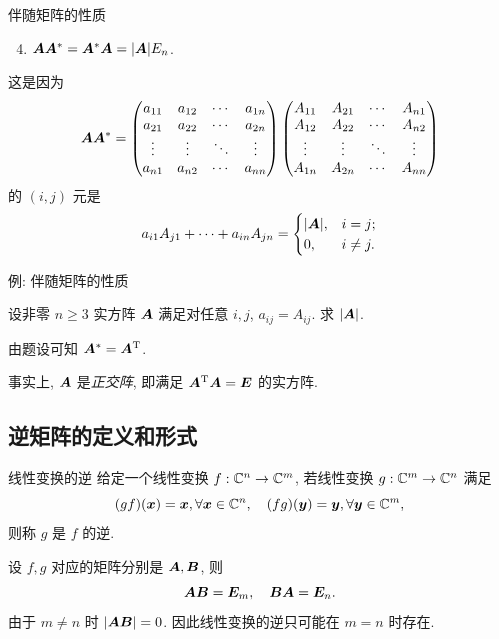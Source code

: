 \begin{frame}{伴随矩阵的性质}
	\begin{second@}
		\begin{enumerate}
			\setcounter{enumi}{3}
			\item \alert{${\boldsymbol{A}}{\boldsymbol{A}}^*={\boldsymbol{A}}^*{\boldsymbol{A}}=|{\boldsymbol{A}}|E_n$.}
		\end{enumerate}
	\end{second@}
	\onslide<+->
	这是因为
	\[{\boldsymbol{A}}{\boldsymbol{A}}^*=\begin{pmatrix}
		a_{11}&a_{12}&\cdots &a_{1n}\\
		a_{21}&a_{22}&\cdots &a_{2n}\\
		\vdots&\vdots&\ddots&\vdots\\
		a_{n1}&a_{n2}&\cdots &a_{nn}
	\end{pmatrix}\begin{pmatrix}
		A_{11}&A_{21}&\cdots&A_{n1}\\
		A_{12}&A_{22}&\cdots&A_{n2}\\
		\vdots&\vdots&\ddots&\vdots\\
		A_{1n}&A_{2n}&\cdots&A_{nn}
	\end{pmatrix}\]
	\onslide<+->
	的 $(i,j)$ 元是
	\[a_{i1}A_{j1}+\cdots+a_{in}A_{jn}=\begin{cases}
		|{\boldsymbol{A}}|,&i=j;\\
		0,&i\neq j.
	\end{cases}\]
\end{frame}


\begin{frame}{例: 伴随矩阵的性质}
	\onslide<+->
	\begin{example}
		设非零 $n\ge 3$ 实方阵 ${\boldsymbol{A}}$ 满足对任意 $i,j$, $a_{ij}=A_{ij}$. 求 $|{\boldsymbol{A}}|$.
	\end{example}
	\onslide<+->
	\begin{solution}
		由题设可知 ${\boldsymbol{A}}^*={\boldsymbol{A}}^{\mathrm{T}}$.
		\onslide<+->{%
			因此 $|\bfA|=|\bfA^*|=|\bfA|^{n-1}$.
		}

	\end{solution}
	\onslide<+->
	事实上, ${\boldsymbol{A}}$ 是\emph{正交阵}, 即满足 ${\boldsymbol{A}}^{\mathrm{T}}{\boldsymbol{A}}={\boldsymbol{E}}$ 的实方阵.
\end{frame}



\subsection{逆矩阵的定义和形式}
\begin{frame}{线性变换的逆}
	\onslide<+->
	给定一个线性变换 $f:{\mathbb{C}}^n\rightarrow{\mathbb{C}}^m$, 若线性变换 $g:{\mathbb{C}}^m\to{\mathbb{C}}^n$ 满足
	\[(gf)({\boldsymbol{x}})={\boldsymbol{x}},\forall {\boldsymbol{x}}\in{\mathbb{C}}^n,\quad
	(fg)({\boldsymbol{y}})={\boldsymbol{y}},\forall {\boldsymbol{y}}\in{\mathbb{C}}^m,\]
	\onslide<+->
	则称 $g$ 是 $f$ 的逆.

	\onslide<+->
	设 $f,g$ 对应的矩阵分别是 ${\boldsymbol{A}},{\boldsymbol{B}}$, 则
	\[{\boldsymbol{A}}{\boldsymbol{B}}={\boldsymbol{E}}_m,\quad {\boldsymbol{B}}{\boldsymbol{A}}={\boldsymbol{E}}_n.\]
	\onslide<+->
	由于 $m\neq n$ 时 $|{\boldsymbol{A}}{\boldsymbol{B}}|=0$.
	\onslide<+->
	因此线性变换的逆只可能在 $m=n$ 时存在.
\end{frame}


